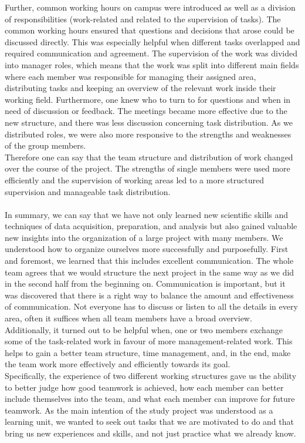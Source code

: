 Further, common working hours on campus were introduced as well as a division of responsibilities (work-related and related to the supervision of tasks). The common working hours ensured that questions and decisions that arose could be discussed directly. This was especially helpful when different tasks overlapped and required communication and agreement.
The supervision of the work was divided into manager roles, which means that the work was split into different main fields where each member was responsible for managing their assigned area, distributing tasks and keeping an overview of the relevant work inside their working field. Furthermore, one knew who to turn to for questions and when in need of discussion or feedback. The meetings became more effective due to the new structure, and there was less discussion concerning task distribution. As we distributed roles, we were also more responsive to the strengths and weaknesses of the group members. \\
Therefore one can say that the team structure and distribution of work changed over the course of the project. The strengths of single members were used more efficiently and the supervision of working areas led to a more structured supervision and manageable task distribution. \\
\\
In summary, we can say that we have not only learned new scientific skills and techniques of data acquisition, preparation, and analysis but also gained valuable new insights into the organization of a large project with many members. We  understood how to organize ourselves more successfully and purposefully. First and foremost, we learned that this includes excellent communication. The whole team agrees that we would structure the next project in the same way as we did in the second half from the beginning on. Communication is important, but it was discovered that there is a right way to balance the amount and effectiveness of communication. Not everyone has to discuss or listen to all the details in every area, often it suffices when all team members have a broad overview.
Additionally, it turned out to be helpful when, one or two members exchange some of the task-related work in favour of more management-related work. This helps to gain a better team structure, time management, and, in the end, make the team work more effectively and efficiently towards its goal. \\
Specifically, the experience of two different working structures gave us the ability to better judge how good teamwork is achieved, how each member can better include themselves into the team, and what each member can improve for future teamwork. As the main intention of the study project was understood as a learning unit, we wanted to seek out tasks that we are motivated to do and that bring us new experiences and skills, and not just practice what we already know. \\
